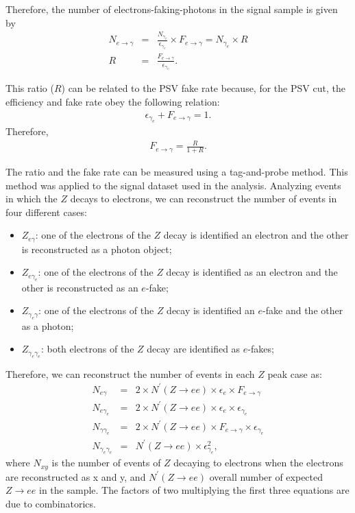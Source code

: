 Therefore, the number of electrons-faking-photons in the signal sample is given by
\begin{eqnarray}
N_{e \rightarrow \gamma} &=& \frac{N_{\gamma_e}}{\epsilon_{\gamma_e}} \times  F_{e\rightarrow \gamma} = N_{\gamma_e} \times R\\
R  &=& \frac{F_{e\rightarrow \gamma}}{\epsilon_{\gamma_e}}.
\end{eqnarray}

This ratio ($R$) can be related to the PSV fake rate because, for the PSV cut, the efficiency and fake rate obey the following relation:
\begin{eqnarray}
\epsilon_{\gamma_e} + F_{e\rightarrow \gamma} = 1.
\end{eqnarray}
Therefore,
\begin{eqnarray}
F_{e \rightarrow \gamma} = \frac{R}{1+R}.
\end{eqnarray}

The ratio and the fake rate can be measured using a tag-and-probe method. This method was applied to the signal dataset used in the analysis. Analyzing events in which the $Z$ decays to electrons, we can reconstruct the number of events in four different cases:

\begin{itemize}
\item $Z_{e\gamma}$: one of the electrons of the $Z$ decay is identified an electron and the other is reconstructed as a photon object;
\item $Z_{e\gamma_e}$: one of the electrons of the $Z$ decay is identified as an electron and the other is reconstructed as an $e$-fake;
\item $Z_{\gamma_e\gamma}$: one of the electrons of the $Z$ decay is identified an $e$-fake and the other as a photon;
\item $Z_{\gamma_e \gamma_e}$:  both electrons of the $Z$ decay are identified as $e$-fakes;
\end{itemize} 

Therefore, we can reconstruct the number of events in each $Z$ peak case as:
\begin{eqnarray}
N_{e\gamma} &=& 2\times N^\prime\left( Z\rightarrow ee \right) \times  \epsilon_{e} \times F_{e\rightarrow\gamma}\\
N_{e\gamma_e} &=& 2\times N^\prime\left( Z\rightarrow ee \right) \times \epsilon_{e} \times \epsilon_{\gamma_e}\\
N_{\gamma \gamma_e} &=& 2\times N^\prime\left( Z\rightarrow ee \right) \times F_{e\rightarrow\gamma}\times \epsilon_{\gamma_e} \\
N_{\gamma_e \gamma_e} &=& N^\prime\left( Z\rightarrow ee \right) \times\epsilon_{\gamma_e}^2,
\end{eqnarray}
where $N_{xy}$ is the number of events of $Z$ decaying to electrons when the electrons are reconstructed as x and y, and $N^\prime\left( Z\rightarrow ee \right)$ overall number of expected $Z\rightarrow ee$ in the sample. The factors of two multiplying the first three equations are due to combinatorics.%

